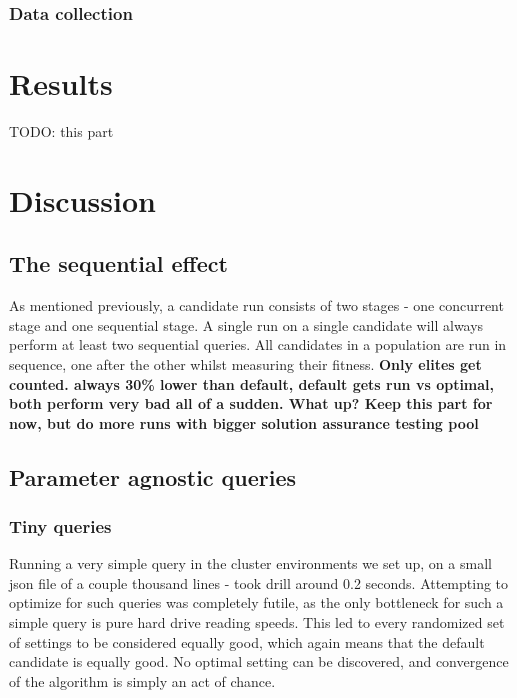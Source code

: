 \documentclass[a4paper,english]{report}
\begin{document}
			\subsection{Data collection}
				
	\chapter{Results}
	TODO: this part
	
	\chapter{Discussion}
	\section{The sequential effect}
	As mentioned previously, a candidate run consists of two stages - one concurrent stage and one sequential stage. A single run on a single candidate will always perform at least two sequential queries. All candidates in a population are run in sequence, one after the other whilst measuring their fitness. \textbf{Only elites get counted. always 30\% lower than default, default gets run vs optimal, both perform very bad all of a sudden. What up? Keep this part for now, but do more runs with bigger solution assurance testing pool}
	\section{Parameter agnostic queries}
		\label{sec:param_agno}
		\subsection{Tiny queries}
		Running a very simple query in the cluster environments we set up, on a small json file of a couple thousand lines - took drill around 0.2 seconds. Attempting to optimize for such queries was completely futile, as the only bottleneck for such a simple query is pure hard drive reading speeds. This led to every randomized set of settings to be considered equally good, which again means that the default candidate is equally good. No optimal setting can be discovered, and convergence of the algorithm is simply an act of chance.
\end{document}
